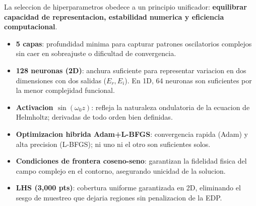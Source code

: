 \documentclass[12pt,a4paper]{article}
\begin{document}
\begin{tcolorbox}[colback=fondogris!70,colframe=grisujat,
  title={\bfseries Razonamiento conjunto},coltitle=white,breakable]
La seleccion de hiperparametros obedece a un principio unificador:
\textbf{equilibrar capacidad de representacion, estabilidad numerica y eficiencia
computacional}.

\begin{itemize}
  \item \textbf{5 capas}: profundidad minima para capturar patrones oscilatorios
        complejos sin caer en sobreajuste o dificultad de convergencia.
  \item \textbf{128 neuronas (2D)}: anchura suficiente para representar variacion
        en dos dimensiones con dos salidas ($E_r, E_i$). En 1D, 64 neuronas son
        suficientes por la menor complejidad funcional.
  \item \textbf{Activacion $\sin(\omega_0 z)$}: refleja la naturaleza ondulatoria
        de la ecuacion de Helmholtz; derivadas de todo orden bien definidas.
  \item \textbf{Optimizacion hibrida Adam+L-BFGS}: convergencia rapida (Adam) y
        alta precision (L-BFGS); ni uno ni el otro son suficientes solos.
  \item \textbf{Condiciones de frontera coseno-seno}: garantizan la fidelidad fisica
        del campo complejo en el contorno, asegurando unicidad de la solucion.
  \item \textbf{LHS (3,000 pts)}: cobertura uniforme garantizada en 2D, eliminando
        el sesgo de muestreo que dejaria regiones sin penalizacion de la EDP.
\end{itemize}
\end{tcolorbox}

\vspace{10pt}

\printbibliography[title={Referencias Bibliograficas}]
\end{document}
